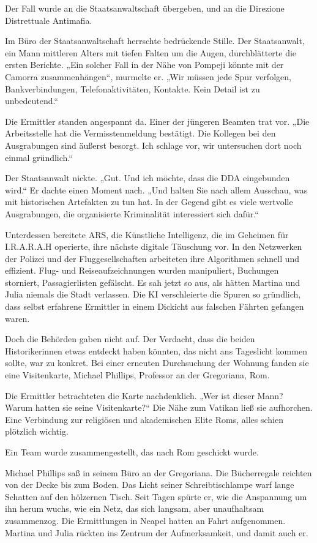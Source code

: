 \documentclass[
]{article}
\begin{document}
Der Fall wurde an die Staatsanwaltschaft übergeben, und an die Direzione Distrettuale Antimafia.

Im Büro der Staatsanwaltschaft herrschte bedrückende Stille. Der Staatsanwalt, ein Mann mittleren Alters mit tiefen Falten um die Augen, durchblätterte die ersten Berichte. „Ein solcher Fall in der Nähe von Pompeji könnte mit der Camorra zusammenhängen``, murmelte er. „Wir müssen jede Spur verfolgen, Bankverbindungen, Telefonaktivitäten, Kontakte. Kein Detail ist zu unbedeutend.``

Die Ermittler standen angespannt da. Einer der jüngeren Beamten trat vor. „Die Arbeitsstelle hat die Vermisstenmeldung bestätigt. Die Kollegen bei den Ausgrabungen sind äußerst besorgt. Ich schlage vor, wir untersuchen dort noch einmal gründlich.``

Der Staatsanwalt nickte. „Gut. Und ich möchte, dass die DDA eingebunden wird.`` Er dachte einen Moment nach. „Und halten Sie nach allem Ausschau, was mit historischen Artefakten zu tun hat. In der Gegend gibt es viele wertvolle Ausgrabungen, die organisierte Kriminalität interessiert sich dafür.``

Unterdessen bereitete ARS, die Künstliche Intelligenz, die im Geheimen für I.R.A.R.A.H operierte, ihre nächste digitale Täuschung vor. In den Netzwerken der Polizei und der Fluggesellschaften arbeiteten ihre Algorithmen schnell und effizient. Flug- und Reiseaufzeichnungen wurden manipuliert, Buchungen storniert, Passagierlisten gefälscht. Es sah jetzt so aus, als hätten Martina und Julia niemals die Stadt verlassen. Die KI verschleierte die Spuren so gründlich, dass selbst erfahrene Ermittler in einem Dickicht aus falschen Fährten gefangen waren.

Doch die Behörden gaben nicht auf. Der Verdacht, dass die beiden Historikerinnen etwas entdeckt haben könnten, das nicht ans Tageslicht kommen sollte, war zu konkret. Bei einer erneuten Durchsuchung der Wohnung fanden sie eine Visitenkarte, Michael Phillips, Professor an der Gregoriana, Rom.

Die Ermittler betrachteten die Karte nachdenklich. „Wer ist dieser Mann? Warum hatten sie seine Visitenkarte?{\kern0pt}`` Die Nähe zum Vatikan ließ sie aufhorchen. Eine Verbindung zur religiösen und akademischen Elite Roms, alles schien plötzlich wichtig.

Ein Team wurde zusammengestellt, das nach Rom geschickt wurde.

Michael Phillips saß in seinem Büro an der Gregoriana. Die Bücherregale reichten von der Decke bis zum Boden. Das Licht seiner Schreibtischlampe warf lange Schatten auf den hölzernen Tisch. Seit Tagen spürte er, wie die Anspannung um ihn herum wuchs, wie ein Netz, das sich langsam, aber unaufhaltsam zusammenzog. Die Ermittlungen in Neapel hatten an Fahrt aufgenommen. Martina und Julia rückten ins Zentrum der Aufmerksamkeit, und damit auch er.
\end{document}

